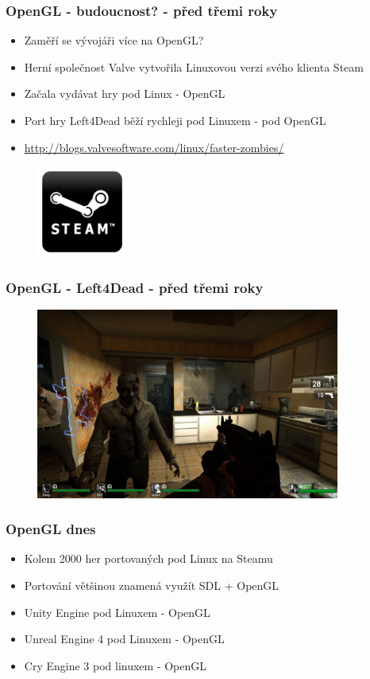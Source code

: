 
\begin{frame}
\frametitle{OpenGL - budoucnost? - před třemi roky}
	\begin{itemize}
	\item{Zaměří se vývojáři více na OpenGL?}
	\item{Herní společnost Valve vytvořila Linuxovou verzi svého klienta Steam}
	\item{Začala vydávat hry pod Linux - OpenGL}
	\item{Port hry Left4Dead běží rychleji pod Linuxem - pod OpenGL}
	\item{\url{http://blogs.valvesoftware.com/linux/faster-zombies/}}
	\end{itemize}
	\begin{figure}[h]
	\includegraphics[width=3cm,keepaspectratio]{pics/steam.jpg}
	\end{figure}
\end{frame}

\begin{frame}
\frametitle{OpenGL - Left4Dead - před třemi roky}
	\begin{figure}[h]
	\includegraphics[width=10cm,keepaspectratio]{pics/left4dead.jpg}
	\end{figure}
\end{frame}

\begin{frame}
\frametitle{OpenGL dnes}
  \begin{itemize}
    \item Kolem 2000 her portovaných pod Linux na Steamu
    \item Portování většinou znamená využít SDL + OpenGL
    \item Unity Engine pod Linuxem - OpenGL
    \item Unreal Engine 4 pod Linuxem - OpenGL
    \item Cry Engine 3 pod linuxem - OpenGL
  \end{itemize}
\end{frame}

